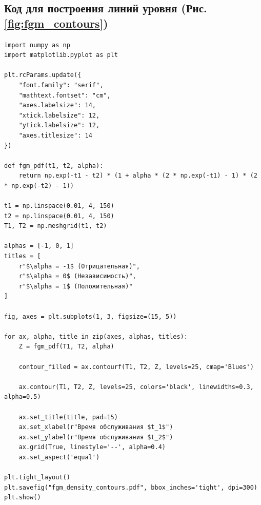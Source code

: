 \documentclass[12pt]{article}
\theoremstyle{plain}
\theoremstyle{definition}
\theoremstyle{remark}
\begin{document}
\subsection*{Код для построения линий уровня (Рис. \ref{fig:fgm_contours})}
\begin{lstlisting}
import numpy as np
import matplotlib.pyplot as plt

plt.rcParams.update({
    "font.family": "serif",
    "mathtext.fontset": "cm",
    "axes.labelsize": 14,
    "xtick.labelsize": 12,
    "ytick.labelsize": 12,
    "axes.titlesize": 14
})

def fgm_pdf(t1, t2, alpha):
    return np.exp(-t1 - t2) * (1 + alpha * (2 * np.exp(-t1) - 1) * (2 * np.exp(-t2) - 1))

t1 = np.linspace(0.01, 4, 150)
t2 = np.linspace(0.01, 4, 150)
T1, T2 = np.meshgrid(t1, t2)

alphas = [-1, 0, 1]
titles = [
    r"$\alpha = -1$ (Отрицательная)",
    r"$\alpha = 0$ (Независимость)",
    r"$\alpha = 1$ (Положительная)"
]

fig, axes = plt.subplots(1, 3, figsize=(15, 5))

for ax, alpha, title in zip(axes, alphas, titles):
    Z = fgm_pdf(T1, T2, alpha)
    
    contour_filled = ax.contourf(T1, T2, Z, levels=25, cmap='Blues')
    
    ax.contour(T1, T2, Z, levels=25, colors='black', linewidths=0.3, alpha=0.5)
    
    ax.set_title(title, pad=15)
    ax.set_xlabel(r"Время обслуживания $t_1$")
    ax.set_ylabel(r"Время обслуживания $t_2$")
    ax.grid(True, linestyle='--', alpha=0.4)
    ax.set_aspect('equal') 

plt.tight_layout()
plt.savefig("fgm_density_contours.pdf", bbox_inches='tight', dpi=300)
plt.show()
\end{lstlisting}
\end{document}
